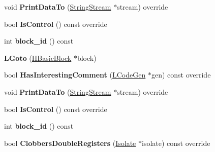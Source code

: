 \begin{DoxyCompactItemize}
\item 
void {\bfseries Print\+Data\+To} (\hyperlink{classv8_1_1internal_1_1_string_stream}{String\+Stream} $\ast$stream) override\hypertarget{classv8_1_1internal_1_1_l_goto_a42fa9224cfb4df48322ebdcf082ab6db}{}\label{classv8_1_1internal_1_1_l_goto_a42fa9224cfb4df48322ebdcf082ab6db}

\item 
bool {\bfseries Is\+Control} () const  override\hypertarget{classv8_1_1internal_1_1_l_goto_a4d45f583f9f81949e0ec9ab82d0a4dd1}{}\label{classv8_1_1internal_1_1_l_goto_a4d45f583f9f81949e0ec9ab82d0a4dd1}

\item 
int {\bfseries block\+\_\+id} () const \hypertarget{classv8_1_1internal_1_1_l_goto_a232c7b24fbe5cb48aa50908fe3d26626}{}\label{classv8_1_1internal_1_1_l_goto_a232c7b24fbe5cb48aa50908fe3d26626}

\item 
{\bfseries L\+Goto} (\hyperlink{classv8_1_1internal_1_1_h_basic_block}{H\+Basic\+Block} $\ast$block)\hypertarget{classv8_1_1internal_1_1_l_goto_a508956b700f4a115d2ae81e5c81b6d52}{}\label{classv8_1_1internal_1_1_l_goto_a508956b700f4a115d2ae81e5c81b6d52}

\item 
bool {\bfseries Has\+Interesting\+Comment} (\hyperlink{classv8_1_1internal_1_1_l_code_gen}{L\+Code\+Gen} $\ast$gen) const  override\hypertarget{classv8_1_1internal_1_1_l_goto_ae2dcadae50f2f182e7f9d772a170fe7b}{}\label{classv8_1_1internal_1_1_l_goto_ae2dcadae50f2f182e7f9d772a170fe7b}

\item 
void {\bfseries Print\+Data\+To} (\hyperlink{classv8_1_1internal_1_1_string_stream}{String\+Stream} $\ast$stream) override\hypertarget{classv8_1_1internal_1_1_l_goto_a42fa9224cfb4df48322ebdcf082ab6db}{}\label{classv8_1_1internal_1_1_l_goto_a42fa9224cfb4df48322ebdcf082ab6db}

\item 
bool {\bfseries Is\+Control} () const  override\hypertarget{classv8_1_1internal_1_1_l_goto_a4d45f583f9f81949e0ec9ab82d0a4dd1}{}\label{classv8_1_1internal_1_1_l_goto_a4d45f583f9f81949e0ec9ab82d0a4dd1}

\item 
int {\bfseries block\+\_\+id} () const \hypertarget{classv8_1_1internal_1_1_l_goto_a232c7b24fbe5cb48aa50908fe3d26626}{}\label{classv8_1_1internal_1_1_l_goto_a232c7b24fbe5cb48aa50908fe3d26626}

\item 
bool {\bfseries Clobbers\+Double\+Registers} (\hyperlink{classv8_1_1internal_1_1_isolate}{Isolate} $\ast$isolate) const  override\hypertarget{classv8_1_1internal_1_1_l_goto_a1185b3211324a679a73448732f2610c4}{}\label{classv8_1_1internal_1_1_l_goto_a1185b3211324a679a73448732f2610c4}


\end{DoxyCompactItemize}
